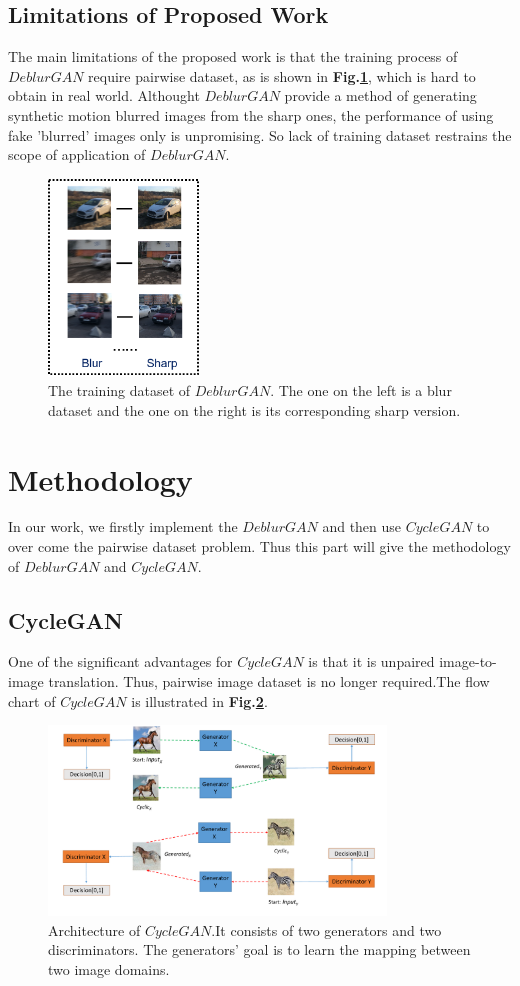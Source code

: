 \documentclass[journal]{IEEEtran}
\begin{document}
\subsection{Limitations of Proposed Work}
The main limitations of the proposed work is that the training process of $DeblurGAN$ require pairwise dataset, as is shown in \textbf{Fig.\ref{keras_dataset}}, which is hard to obtain in real world. Althought $DeblurGAN$ provide a method of generating synthetic motion blurred images from the sharp ones, the performance of using fake 'blurred' images only is unpromising. So lack of training dataset restrains the scope of application of $DeblurGAN$. 
\begin{figure}[htbp]
	\centering
	\footnotesize
	\includegraphics[width=4cm]{fig/keras_dataset.png}
	\caption{The training dataset of $DeblurGAN$. The one on the left is a blur dataset and the one on the right is its corresponding sharp version.}
	\label{keras_dataset}
\end{figure}

\section{Methodology} 
In our work, we firstly implement the $DeblurGAN$ and then use $CycleGAN$ to over come the pairwise dataset problem. Thus this part will give the methodology of $DeblurGAN$ and $CycleGAN$.

\subsection{CycleGAN}
One of the significant advantages for $CycleGAN$ is that it is unpaired image-to-image translation. Thus, pairwise image dataset is no longer required.The flow chart of $CycleGAN$ is illustrated in \textbf{Fig.\ref{pipeline}}.
\begin{figure}
	\centering
	\footnotesize
	\includegraphics[width=0.8\textwidth]{fig/pipeline.pdf}
	\caption{Architecture of $CycleGAN$.It consists of two generators and two discriminators. The generators' goal is to learn the mapping between two image domains.}
	\label{pipeline}
\end{figure}
\end{document}
